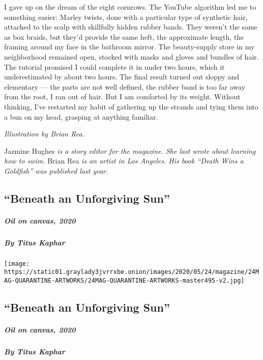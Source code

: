 I gave up on the dream of the eight cornrows. The YouTube algorithm led
me to something easier: Marley twists, done with a particular type of
synthetic hair, attached to the scalp with skillfully hidden rubber
bands. They weren't the same as box braids, but they'd provide the same
heft, the approximate length, the framing around my face in the bathroom
mirror. The beauty-supply store in my neighborhood remained open,
stocked with masks and gloves and bundles of hair. The tutorial promised
I could complete it in under two hours, which it underestimated by about
two hours. The final result turned out sloppy and elementary --- the
parts are not well defined, the rubber band is too far away from the
root, I ran out of hair. But I am comforted by its weight. Without
thinking, I've restarted my habit of gathering up the strands and tying
them into a bun on my head, grasping at anything familiar.

\emph{Illustration by Brian Rea.}

Jazmine Hughes \emph{is a story editor for the magazine. She last wrote
about learning how to swim.} Brian Rea \emph{is an artist in Los
Angeles. His book ``Death Wins a Goldfish'' was published last year.}

\hypertarget{beneath-an-unforgiving-sun}{%
\subsection{``Beneath an Unforgiving
Sun''}\label{beneath-an-unforgiving-sun}}

\hypertarget{oil-on-canvas-2020}{%
\subparagraph{Oil on canvas, 2020}\label{oil-on-canvas-2020}}

\hypertarget{by-titus-kaphar}{%
\subparagraph{By Titus Kaphar}\label{by-titus-kaphar}}

\texttt{[image: https://static01.graylady3jvrrxbe.onion/images/2020/05/24/magazine/24MAG-QUARANTINE-ARTWORKS/24MAG-QUARANTINE-ARTWORKS-master495-v2.jpg]}

\hypertarget{beneath-an-unforgiving-sun-1}{%
\subsection{``Beneath an Unforgiving
Sun''}\label{beneath-an-unforgiving-sun-1}}

\hypertarget{oil-on-canvas-2020-1}{%
\subparagraph{Oil on canvas, 2020}\label{oil-on-canvas-2020-1}}

\hypertarget{by-titus-kaphar-1}{%
\subparagraph{By Titus Kaphar}\label{by-titus-kaphar-1}}

